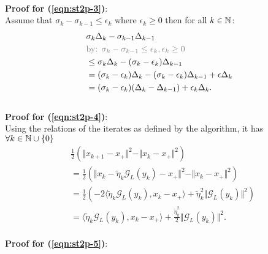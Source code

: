 \documentclass[12pt]{article}
\begin{document}
        \\
        \textbf{Proof for (\ref*{eqn:st2p-3})}: 
        \\
        Assume that $\sigma_k - \sigma_{k -1} \le \epsilon_k$ where $\epsilon_k \ge 0$ then for all $k \in \mathbb N$: 
        \begin{align*}
            &
            \sigma_k \Delta_k - \sigma_{k - 1} \Delta_{k - 1}
            \\
            & 
            \textcolor{gray}{
                \text{by: } \sigma_k - \sigma_{k - 1} \le \epsilon_k, \epsilon_k \ge 0
            }
            \\
            &\le 
            \sigma_k \Delta_k - (\sigma_k - \epsilon_k)\Delta_{k - 1}
            \\
            &= 
            (\sigma_k - \epsilon_k)\Delta_k - (\sigma_k - \epsilon_k)\Delta_{k - 1}
            + \epsilon \Delta_k 
            \\
            &= (\sigma_k - \epsilon_k)(\Delta_k - \Delta_{k - 1}) + \epsilon_k \Delta_k. 
        \end{align*}
        \\
        \textbf{Proof for (\ref*{eqn:st2p-4})}:
        \\
        Using the relations of the iterates as defined by the algorithm, it has $\forall k \in \mathbb N\cup \{0\}$
        \begin{align*}
            & \frac{1}{2} 
            \left(
                \Vert x_{k + 1} - x_+\Vert^2
                - 
                \Vert x_k - x_+\Vert^2 
            \right)
            \\
            &=
            \frac{1}{2} 
            \left(
                \Vert x_k - \tilde \eta_k\mathcal G_L (y_k) - x_+ \Vert^2 
                - 
                \Vert x_k - x_+\Vert^2
            \right)
            \\
            &= 
            \frac{1}{2}\left(
                -2\langle \tilde \eta_k \mathcal G_L(y_k), x_k - x_+\rangle
                + 
                \tilde \eta_k^2 \Vert \mathcal G_L(y_k)\Vert^2
            \right)
            \\
            &= 
            \langle \tilde \eta_k \mathcal G_L(y_k), x_k - x_+\rangle
                + 
            \frac{\tilde \eta_k^2}{2} \Vert \mathcal G_L(y_k)\Vert^2. 
        \end{align*}
        \\
        \textbf{Proof for (\ref*{eqn:st2p-5})}:
        \\
\end{document}
